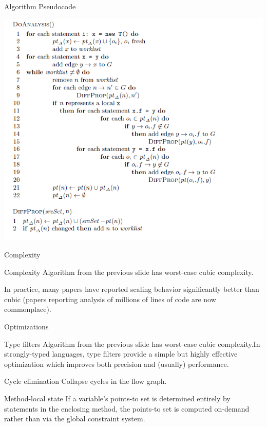 \documentclass{beamer}
\begin{document}
\begin{frame}{Algorithm Pseudocode}
	\centerline{\includegraphics[width=0.75\paperwidth]{fig3.png}}
\end{frame}

\begin{frame}{Complexity}
	\begin{block}{Complexity}
		Algorithm from the previous slide has worst-case cubic complexity.
	\end{block}
	\pause
	\begin{block}{}
		In practice, many papers have reported scaling behavior significantly better
		than cubic (papers reporting analysis of millions of lines of code are now commonplace).
	\end{block}
\end{frame}

\begin{frame}{Optimizations}
	\begin{block}{Type filters}
		Algorithm from the previous slide has worst-case cubic complexity.In strongly-typed languages, type 
		filters provide a simple but highly effective optimization which improves 
		both precision and (usually) performance.
	\end{block}
	\pause
	\begin{block}{Cycle elimination}
		Collapse cycles in the flow graph.
	\end{block}
	\pause
	\begin{block}{Method-local state}
		If a variable's points-to set is determined entirely by statements in the enclosing method,
		the points-to set is computed on-demand rather than via the global constraint system.
	\end{block}
\end{frame}
\end{document}
